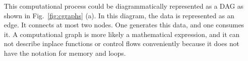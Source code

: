 \documentclass{article}
\newcommand{\<}{\langle}
\renewcommand{\>}{\rangle}
\newcommand{\Fig}[1]{Fig.~\ref{#1}}
\theoremstyle{definition}\newtheorem{definition}{\textit{Definition}}
\begin{document}
This computational process could be diagrammatically represented as a DAG as shown in \Fig{fig:cgraphs} (a).
In this diagram, the data is represented as an edge. It connects at most two nodes. One generates this data, and one consumes it.
A computational graph is more likely a mathematical expression, and it can not describe inplace functions or control flows conveniently because it does not have the notation for memory and loops.
\end{document}
